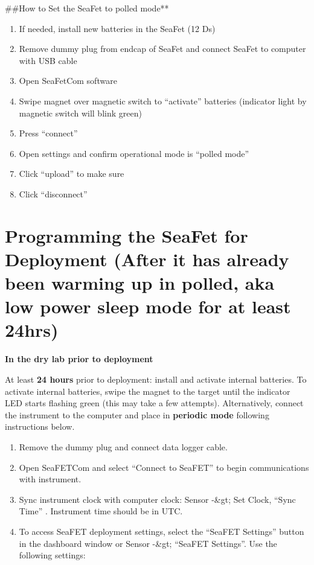 \documentclass[]{book}
\providecommand{\tightlist}{%
  \setlength{\itemsep}{0pt}\setlength{\parskip}{0pt}}
\begin{document}
\#\#How to Set the SeaFet to polled mode**

\begin{enumerate}
\def\labelenumi{\arabic{enumi}.}
\tightlist
\item
  If needed, install new batteries in the SeaFet (12 Ds)
\item
  Remove dummy plug from endcap of SeaFet and connect SeaFet to computer with USB cable
\item
  Open SeaFetCom software
\item
  Swipe magnet over magnetic switch to ``activate'' batteries (indicator light by magnetic switch will blink green)
\item
  Press ``connect''
\item
  Open settings and confirm operational mode is ``polled mode''
\item
  Click ``upload'' to make sure
\item
  Click ``disconnect''
\end{enumerate}

\hypertarget{programming-the-seafet-for-deployment-after-it-has-already-been-warming-up-in-polled-aka-low-power-sleep-mode-for-at-least-24hrs}{%
\section{Programming the SeaFet for Deployment (After it has already been warming up in polled, aka low power sleep mode for at least 24hrs)}\label{programming-the-seafet-for-deployment-after-it-has-already-been-warming-up-in-polled-aka-low-power-sleep-mode-for-at-least-24hrs}}

\textbf{In the dry lab prior to deployment}

At least \textbf{24 hours} prior to deployment: install and activate internal batteries. To activate internal batteries, swipe the magnet to the target until the indicator LED starts flashing green (this may take a few attempts). Alternatively, connect the instrument to the computer and place in \textbf{periodic mode} following instructions below.

\begin{enumerate}
\def\labelenumi{\arabic{enumi}.}
\item
  Remove the dummy plug and connect data logger cable.
\item
  Open SeaFETCom and select ``Connect to SeaFET'' to begin communications with instrument.
\item
  Sync instrument clock with computer clock: Sensor -\&gt; Set Clock, ``Sync Time'' . Instrument time should be in UTC.
\item
  To access SeaFET deployment settings, select the ``SeaFET Settings'' button in the dashboard window or Sensor -\&gt; ``SeaFET Settings''. Use the following settings:
\end{enumerate}
\end{document}
